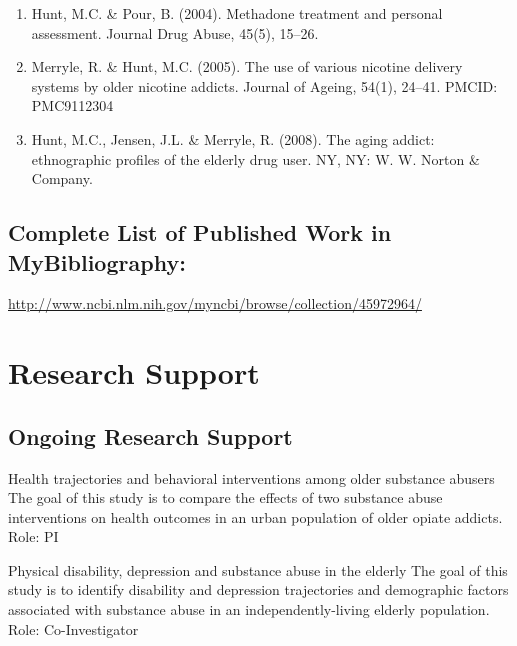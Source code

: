 \documentclass{nihbiosketch}
\begin{document}
\begin{enumerate}
\begin{enumerate}
\item Hunt, M.C. \& Pour, B. (2004). Methadone treatment and personal
        assessment. Journal Drug Abuse, 45(5), 15--26. 

\item  Merryle, R. \& Hunt, M.C. (2005). The use of various nicotine delivery
        systems by older nicotine addicts. Journal of Ageing, 54(1), 24--41.
        PMCID: PMC9112304

\item Hunt, M.C., Jensen, J.L. \& Merryle, R. (2008). The aging addict:
        ethnographic profiles of the elderly drug user.  NY, NY: W. W. Norton
        \& Company.

\end{enumerate}

\end{enumerate}

\subsection*{Complete List of Published Work in MyBibliography:} 
\url{http://www.ncbi.nlm.nih.gov/myncbi/browse/collection/45972964/}



\section{Research Support}

\subsection*{Ongoing Research Support}

{Health trajectories and behavioral interventions among older substance abusers}
{The goal of this study is to compare the effects of two substance abuse interventions on health 
outcomes in an urban population of older opiate addicts.}
{Role: PI}

\bigskip

{Physical disability, depression and substance abuse in the elderly}
{The goal of this study is to identify disability and depression trajectories and demographic factors 
associated with substance abuse in an independently-living elderly population.}
{Role: Co-Investigator}
\end{document}
